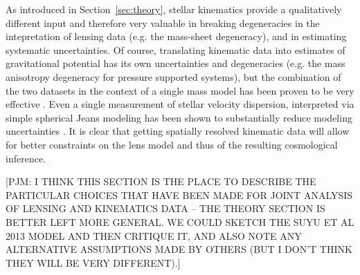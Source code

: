 As introduced in Section~\ref{sec:theory}, stellar kinematics provide
a qualitatively different input and therefore very valuable in
breaking degeneracies in the intepretation of lensing data (e.g. the
mass-sheet degeneracy), and in estimating systematic uncertainties. Of
course, translating kinematic data into estimates of gravitational
potential has its own uncertainties and degeneracies (e.g. the mass
anisotropy degeneracy for pressure supported systems), but the
combination of the two datasets in the context of a single mass model
has been proven to be very effective
\citep{T+K04}. Even a single measurement of stellar velocity dispersion,
interpreted via
simple spherical Jeans modeling has been shown to substantially
reduce modeling uncertainties \citep{T+K02b,Koo++03,Suy++14}. It is
clear that getting spatially resolved kinematic data will allow for
better constraints on the lens model and thus of the resulting
cosmological inference.

[PJM: I THINK THIS SECTION IS THE PLACE TO DESCRIBE THE PARTICULAR
CHOICES THAT HAVE BEEN MADE FOR JOINT ANALYSIS OF LENSING AND KINEMATICS
DATA --  THE THEORY SECTION IS BETTER LEFT MORE GENERAL. WE COULD SKETCH
THE SUYU ET AL 2013 MODEL AND THEN CRITIQUE IT, AND ALSO NOTE ANY
ALTERNATIVE ASSUMPTIONS MADE BY OTHERS (BUT I DON'T THINK THEY WILL BE
VERY DIFFERENT).]
